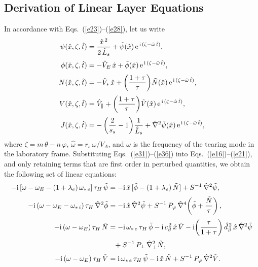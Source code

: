 \documentclass[12pt,prb,aps]{revtex4-1}
\begin{document}
\subsection{Derivation of Linear Layer Equations}
In accordance with Eqs.~(\ref{e23})--(\ref{e28}), let us write
\begin{align}\label{e31}
\psi(\hat{x},\zeta,\hat{t}) &= \frac{\hat{x}^{\,2} }{2\,\hat{L}_s}+ \tilde{\psi}(\hat{x})\,{\rm e}^{\,{\rm i}\,(\zeta-\hat{\omega}\,\hat{t})},\\[0.5ex]
\phi(\hat{x},\zeta,\hat{t}) &=-\hat{V}_E\,\hat{x}+ \tilde{\phi}(\hat{x})\,{\rm e}^{\,{\rm i}\,(\zeta-\hat{\omega}\,\hat{t})},\\[0.5ex]
N(\hat{x},\zeta,\hat{t}) &= -\hat{V}_\ast\,\hat{x}+\left(\frac{1+\tau}{\tau}\right)\!\tilde{N}(\hat{x})\,{\rm e}^{\,{\rm i}\,(\zeta-\hat{\omega}\,\hat{t})},\\[0.5ex]
V(\hat{x},\zeta,\hat{t}) &= \hat{V}_\parallel + \left(\frac{1+\tau}{\tau}\right)\!\tilde{V}(\hat{x})\,{\rm e}^{\,{\rm i}\,(\zeta-\hat{\omega}\,\hat{t})},\\[0.5ex]
J(\hat{x},\zeta,\hat{t}) &=-\left(\frac{2}{s_s}-1\right)\!\frac{1}{\hat{L}_s}+ \hat{\nabla}^2\tilde{\psi}(\hat{x})\,{\rm e}^{\,{\rm i}\,(\zeta-\hat{\omega}\,\hat{t})},\label{e36}
\end{align}
where $\zeta=m\,\theta-n\,\varphi$, $\hat{\omega}=r_s\,\omega/V_A$, and $\omega$ is the frequency of the tearing mode in the laboratory frame. 
Substituting Eqs.~(\ref{e31})--(\ref{e36}) into Eqs.~(\ref{e16})--(\ref{e21}), 
 and only retaining terms that
are first order in perturbed quantities, we obtain the following set of linear equations:
\begin{align}\label{e37}
-{\rm i}\,[\omega-\omega_E -(1+\lambda_e)\,\omega_{\ast\,e}]\,\tau_H\,\tilde{\psi} &= -{\rm i} \,\hat{x}\,[\tilde{\phi}-(1+\lambda_e)\,\tilde{N}] + S^{-1}\,\hat{\nabla}^2\tilde{\psi},\\[0.5ex]
-{\rm i}\,(\omega-\omega_E-\omega_{\ast\,i})\,\tau_H\,\hat{\nabla}^2\tilde{\phi} &= -{\rm i}\,\hat{x}\,\hat{\nabla}^2\tilde{\psi}+S^{-1}\,P_\varphi\,\hat{\nabla}^4\!\left(\tilde{\phi} + \frac{\tilde{N}}{\tau}\right),\\[0.5ex]
-{\rm i}\,(\omega-\omega_E)\,\tau_H\,\tilde{N} &= -{\rm i}\,\omega_{\ast\,e}\,\tau_H\,\tilde{\phi}-{\rm i}\,c_\beta^{\,2}\,\hat{x}\,\tilde{V} - {\rm i}\!\left(\frac{\tau}{1+\tau}\right)\hat{d}_\beta^{\,2}\,\hat{x}\,\hat{\nabla}^2\tilde{\psi}\nonumber\\[0.5ex]
&\phantom{=} + S^{-1}\,P_\perp\,\hat{\nabla}_\perp^2 \tilde{N},\\[0.5ex]
-{\rm i}\,(\omega-\omega_E)\,\tau_H\,\tilde{V} &= {\rm i}\,\omega_{\ast\,e}\,\tau_H\,\tilde{\psi} - {\rm i}\,\hat{x}\,\tilde{N}
+ S^{-1}\,P_\varphi\,\hat{\nabla}^2\tilde{V}.\label{e40}
\end{align}
\end{document}
